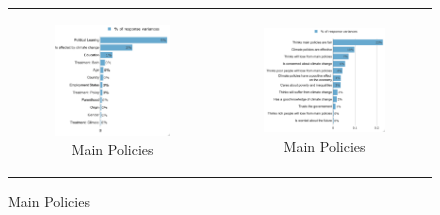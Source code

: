 \documentclass{article}
\begin{document}
\begin{figure}[h!]
\begin{center}
	\begin{tabular}{cc}
		\begin{subfigure}{0.5\textwidth}
		\caption{Main Policies}
			\includegraphics[width=\textwidth]{lmg_main_policies_socio_non_standardized}
		\end{subfigure}&
		\begin{subfigure}{0.5\textwidth}
		\caption{Main Policies}
			\includegraphics[width=\textwidth]{lmg_main_policies_indices_non_standardized}
		\end{subfigure}\\
	\end{tabular}
\end{center}
\end{figure}
\end{document}
